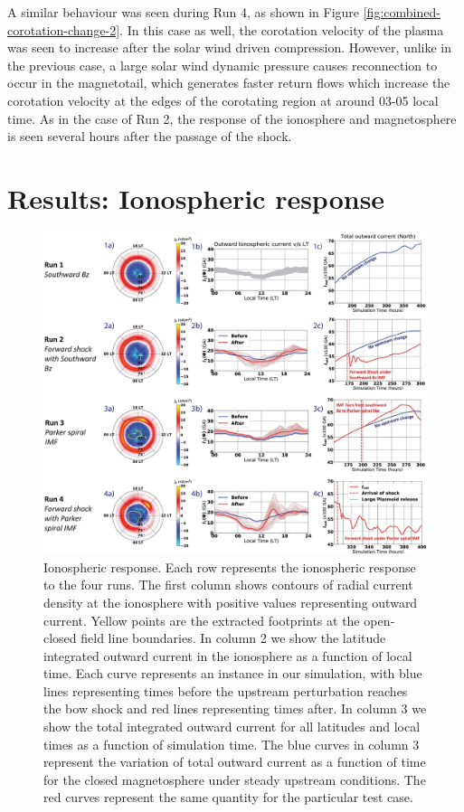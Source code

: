 A similar behaviour was seen during Run 4, as shown in Figure \ref{fig:combined-corotation-change-2}. In this case as well, the corotation velocity of the plasma was seen to increase after the solar wind driven compression. However, unlike in the previous case, a large solar wind dynamic pressure causes reconnection to occur in the magnetotail, which generates faster return flows which increase the corotation velocity at the edges of the corotating region at around 03-05 local time. As in the case of Run 2, the response of the ionosphere and magnetosphere is seen several hours after the passage of the shock.

\section{Results: Ionospheric response}

\begin{figure}
    \centering
    \includegraphics[width=\textwidth]{images3/ionosphere-currents.jpg}
    \caption{Ionospheric response. Each row represents the ionospheric response to the four runs. The first column shows contours of radial current density at the ionosphere with positive values representing outward current. Yellow points are the extracted footprints at the open‐closed field line boundaries. In column 2 we show the latitude integrated outward current in the ionosphere as a function of local time. Each curve represents an instance in our simulation, with blue lines representing times before the upstream perturbation reaches the bow shock and red lines representing times after. In column 3 we show the total integrated outward current for all latitudes and local times as a function of simulation time. The blue curves in column 3 represent the variation of total outward current as a function of time for the closed magnetosphere under steady upstream conditions. The red curves represent the same quantity for the particular test case.}
    \label{fig:ionosphere-currents}
\end{figure}

